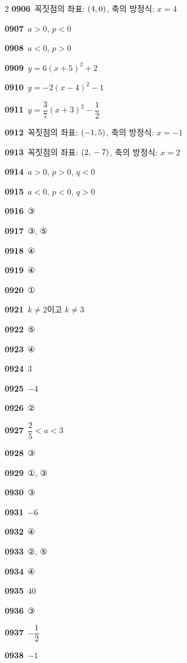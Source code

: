\documentclass[10pt,a4paper]{article}
\begin{document}
\begin{multicols}{2}
\noindent\textbf{0906}\ 꼭짓점의 좌표: $(4{,}\mkern3mu 0)$, 축의 방정식: $x=4$\par
\noindent\textbf{0907}\ $a>0$, $p<0$\par
\noindent\textbf{0908}\ $a<0$, $p>0$\par
\noindent\textbf{0909}\ $y=6(x+5)^2+2$\par
\noindent\textbf{0910}\ $y=-2(x-4)^2-1$\par
\noindent\textbf{0911}\ $y=\dfrac{3}{7}(x+3)^2-\dfrac{1}{2}$\par
\noindent\textbf{0912}\ 꼭짓점의 좌표: $(-1{,}\mkern3mu 5)$, 축의 방정식: $x=-1$\par
\noindent\textbf{0913}\ 꼭짓점의 좌표: $(2{,}\mkern3mu -7)$, 축의 방정식: $x=2$\par
\noindent\textbf{0914}\ $a>0$, $p>0$, $q<0$\par
\noindent\textbf{0915}\ $a<0$, $p<0$, $q>0$\par
\noindent\textbf{0916}\ ③\par
\noindent\textbf{0917}\ ③, ⑤\par
\noindent\textbf{0918}\ ④\par
\noindent\textbf{0919}\ ④\par
\noindent\textbf{0920}\ ①\par
\noindent\textbf{0921}\ $k\neq2$이고 $k\neq3$\par
\noindent\textbf{0922}\ ⑤\par
\noindent\textbf{0923}\ ④\par
\noindent\textbf{0924}\ $3$\par
\noindent\textbf{0925}\ $-4$\par
\noindent\textbf{0926}\ ②\par
\noindent\textbf{0927}\ $\dfrac{2}{5}<a<3$\par
\noindent\textbf{0928}\ ③\par
\noindent\textbf{0929}\ ①, ③\par
\noindent\textbf{0930}\ ③\par
\noindent\textbf{0931}\ $-6$\par
\noindent\textbf{0932}\ ④\par
\noindent\textbf{0933}\ ②, ⑤\par
\noindent\textbf{0934}\ ④\par
\noindent\textbf{0935}\ $40$\par
\noindent\textbf{0936}\ ③\par
\noindent\textbf{0937}\ $-\dfrac{1}{2}$\par
\noindent\textbf{0938}\ $-1$\par

\end{multicols}
\end{document}
